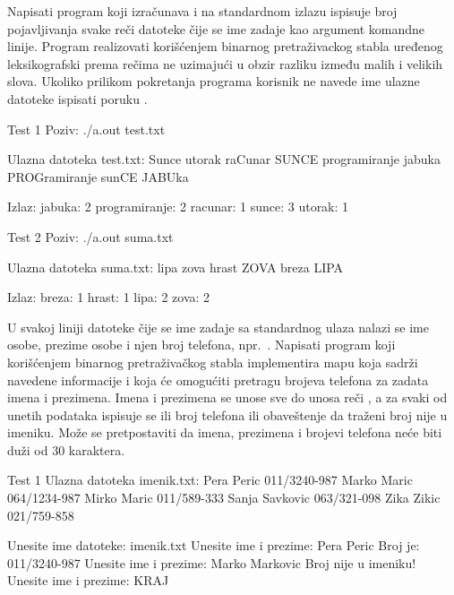 \begin{Exercise}[label=702]
Napisati program koji izračunava i na standardnom izlazu ispisuje broj pojavljivanja svake reči datoteke čije se ime zadaje kao argument komandne linije. Program realizovati korišćenjem binarnog pretraživackog stabla uređenog leksikografski prema rečima ne uzimajući u obzir razliku između malih i velikih slova. Ukoliko prilikom pokretanja programa korisnik ne navede ime ulazne datoteke ispisati poruku .


\begin{miditest}
\begin{test}{Test 1}
Poziv: ./a.out test.txt

Ulazna datoteka test.txt:
Sunce utorak raCunar SUNCE programiranje jabuka PROGramiranje sunCE JABUka

Izlaz:
jabuka: 2
programiranje: 2
racunar: 1
sunce: 3
utorak: 1
\end{test}
\end{miditest}
\begin{miditest}
\begin{test}{Test 2}
Poziv: ./a.out suma.txt

Ulazna datoteka suma.txt:
lipa zova hrast ZOVA breza LIPA

Izlaz:
breza: 1
hrast: 1
lipa: 2
zova: 2
\end{test}
\end{miditest}
\end{Exercise}

\begin{Answer}[ref=702]
\end{Answer}


\begin{Exercise}[label=704]
U svakoj liniji datoteke čije se ime zadaje sa standardnog ulaza nalazi se ime osobe, prezime osobe i njen broj telefona, npr.~. Napisati program koji korišćenjem binarnog pretraživačkog stabla implementira mapu koja sadrži navedene informacije i koja će omogućiti pretragu brojeva telefona za zadata imena i prezimena. Imena i prezimena se unose sve do unosa reči , a za svaki od unetih podataka ispisuje se ili broj telefona ili obaveštenje da traženi broj nije u imeniku. Može se pretpostaviti da imena, prezimena i brojevi telefona neće biti duži od $30$ karaktera.  

\begin{maxitest}
\begin{test}{Test 1}
Ulazna datoteka imenik.txt:
   Pera Peric 011/3240-987
   Marko Maric 064/1234-987
   Mirko Maric 011/589-333
   Sanja Savkovic 063/321-098
   Zika Zikic 021/759-858


Unesite ime datoteke: imenik.txt
Unesite ime i prezime: Pera Peric
Broj je: 011/3240-987
Unesite ime i prezime: Marko Markovic
Broj nije u imeniku!
Unesite ime i prezime: KRAJ
\end{test}
\end{maxitest}
\end{Exercise}

